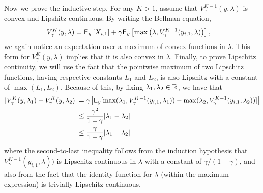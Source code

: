 \begin{myproof}[Proof.]
	Now we prove the inductive step. For any $K > 1$, assume that $V^{K-1}_\gamma(y, \lambda)$ is convex and Lipshitz continuous. By writing the Bellman equation,
	{\color{blue}
	\begin{align*}
	V^K_\gamma(y, \lambda) & = \mathsf{E}_y\left[X_{i,1}\right] + \gamma\mathsf{E}_y\left[\max\left(\lambda, V^{K-1}_\gamma(y_{i,1}, \lambda)\right) \right],
	\end{align*}
	}
	we again notice an expectation over a maximum of convex functions in $\lambda$. This form for $V^K_\gamma(y, \lambda)$ implies that  it is also convex in $\lambda$. %
	{\color{blue}Finally, to prove Lipschitz continuity, we will use the fact that the pointwise maximum of two Lipschitz functions, having respective constants $L_1$ and $L_2$, is also Lipshitz with a constant of $\max(L_1, L_2)$. Because of this, by fixing $\lambda_1, \lambda_2 \in \mathbb{R}$, we have that
		\begin{align*}
		| V^K_\gamma(y, \lambda_1) - V^K_\gamma(y, \lambda_2)| & =  \gamma \left|\mathsf{E}_y[\max(\lambda_1, V^{K-1}_\gamma(y_{i,1}, \lambda_1)) - \max(\lambda_2, V^{K-1}_\gamma(y_{i,1}, \lambda_2))  ]  \right| \\
		& \leq \frac{\gamma^2}{1-\gamma} |\lambda_1 - \lambda_2| \\
		& \leq \frac{\gamma}{1-\gamma} |\lambda_1 - \lambda_2|
		\end{align*}
	where the second-to-last inequality follows from the induction hypothesis that $V^{K-1}_\gamma(y_{i,1}, \lambda))$ is Lipschitz continuous in $\lambda$ with a constant of $\gamma/(1-\gamma)$, and also from the fact that the identity function for $\lambda$ (within the maximum expression) is trivially Lipschitz continuous.
	}
\end{myproof}

